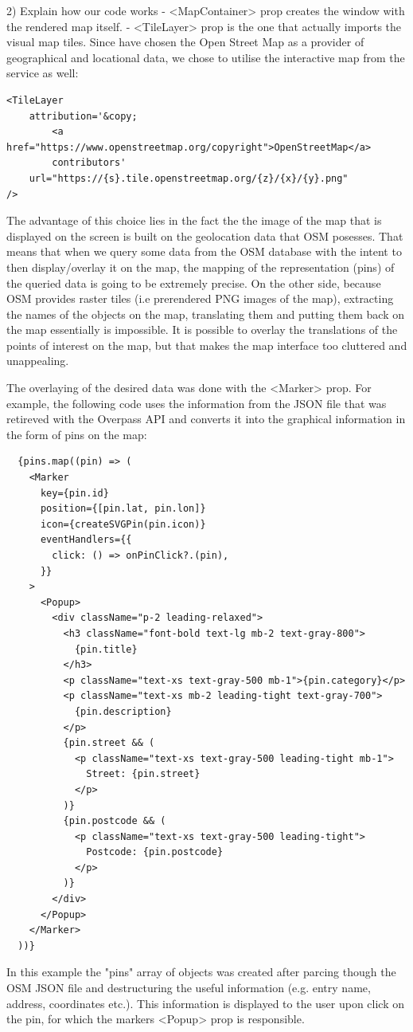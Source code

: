 2) Explain how our code works
- <MapContainer> prop creates the window with the rendered map itself.
- <TileLayer> prop is the one that actually imports the visual map tiles. Since have chosen the Open Street Map as a provider of geographical and locational data, we chose to utilise the interactive map from the service as well:
\begin{verbatim}
<TileLayer
    attribution='&copy; 
        <a href="https://www.openstreetmap.org/copyright">OpenStreetMap</a> 
        contributors'
    url="https://{s}.tile.openstreetmap.org/{z}/{x}/{y}.png"
/>
\end{verbatim}
The advantage of this choice lies in the fact the the image of the map that is displayed on the screen is built on the geolocation data that OSM posesses. That means that when we query some data from the OSM database with the intent to then display/overlay it on the map, the mapping of the representation (pins) of the queried data is going to be extremely precise. On the other side, because OSM provides raster tiles (i.e prerendered PNG images of the map), extracting the names of the objects on the map, translating them and putting them back on the map essentially is impossible. It is possible to overlay the translations of the points of interest on the map, but that makes the map interface too cluttered and unappealing.

The overlaying of the desired data was done with the <Marker> prop. For example, the following code uses the information from the JSON file that was retireved with the Overpass API and converts it into the graphical information in the form of pins on the map:
\begin{verbatim}
  {pins.map((pin) => (
    <Marker
      key={pin.id}
      position={[pin.lat, pin.lon]}
      icon={createSVGPin(pin.icon)}
      eventHandlers={{
        click: () => onPinClick?.(pin),
      }}
    >
      <Popup>
        <div className="p-2 leading-relaxed">
          <h3 className="font-bold text-lg mb-2 text-gray-800">
            {pin.title}
          </h3>
          <p className="text-xs text-gray-500 mb-1">{pin.category}</p>
          <p className="text-xs mb-2 leading-tight text-gray-700">
            {pin.description}
          </p>
          {pin.street && (
            <p className="text-xs text-gray-500 leading-tight mb-1">
              Street: {pin.street}
            </p>
          )}
          {pin.postcode && (
            <p className="text-xs text-gray-500 leading-tight">
              Postcode: {pin.postcode}
            </p>
          )}
        </div>
      </Popup>
    </Marker>
  ))}
\end{verbatim}
In this example the "pins" array of objects was created after parcing though the OSM JSON file and destructuring the useful information (e.g. entry name, address, coordinates etc.). This information is displayed to the user upon click on the pin, for which the markers <Popup> prop is responsible. 

